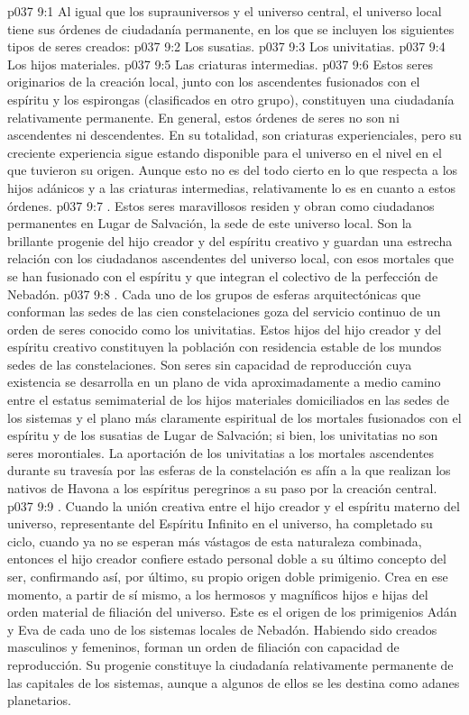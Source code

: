 \vs p037 9:1 Al igual que los suprauniversos y el universo central, el universo local tiene sus órdenes de ciudadanía permanente, en los que se incluyen los siguientes tipos de seres creados:
\vs p037 9:2 Los susatias.
\vs p037 9:3 Los univitatias.
\vs p037 9:4 Los hijos materiales.
\vs p037 9:5 Las criaturas intermedias.
\vs p037 9:6 \pc Estos seres originarios de la creación local, junto con los ascendentes fusionados con el espíritu y los espirongas (clasificados en otro grupo), constituyen una ciudadanía relativamente permanente. En general, estos órdenes de seres no son ni ascendentes ni descendentes. En su totalidad, son criaturas experienciales, pero su creciente experiencia sigue estando disponible para el universo en el nivel en el que tuvieron su origen. Aunque esto no es del todo cierto en lo que respecta a los hijos adánicos y a las criaturas intermedias, relativamente lo es en cuanto a estos órdenes.
\vs p037 9:7 \pc {}. Estos seres maravillosos residen y obran como ciudadanos permanentes en Lugar de Salvación, la sede de este universo local. Son la brillante progenie del hijo creador y del espíritu creativo y guardan una estrecha relación con los ciudadanos ascendentes del universo local, con esos mortales que se han fusionado con el espíritu y que integran el colectivo de la perfección de Nebadón.
\vs p037 9:8 \pc {}. Cada uno de los grupos de esferas arquitectónicas que conforman las sedes de las cien constelaciones goza del servicio continuo de un orden de seres conocido como los univitatias. Estos hijos del hijo creador y del espíritu creativo constituyen la población con residencia estable de los mundos sedes de las constelaciones. Son seres sin capacidad de reproducción cuya existencia se desarrolla en un plano de vida aproximadamente a medio camino entre el estatus semimaterial de los hijos materiales domiciliados en las sedes de los sistemas y el plano más claramente espiritual de los mortales fusionados con el espíritu y de los susatias de Lugar de Salvación; si bien, los univitatias no son seres morontiales. La aportación de los univitatias a los mortales ascendentes durante su travesía por las esferas de la constelación es afín a la que realizan los nativos de Havona a los espíritus peregrinos a su paso por la creación central.
\vs p037 9:9 \pc {}. Cuando la unión creativa entre el hijo creador y el espíritu materno del universo, representante del Espíritu Infinito en el universo, ha completado su ciclo, cuando ya no se esperan más vástagos de esta naturaleza combinada, entonces el hijo creador confiere estado personal doble a su último concepto del ser, confirmando así, por último, su propio origen doble primigenio. Crea en ese momento, a partir de sí mismo, a los hermosos y magníficos hijos e hijas del orden material de filiación del universo. Este es el origen de los primigenios Adán y Eva de cada uno de los sistemas locales de Nebadón. Habiendo sido creados masculinos y femeninos, forman un orden de filiación con capacidad de reproducción. Su progenie constituye la ciudadanía relativamente permanente de las capitales de los sistemas, aunque a algunos de ellos se les destina como adanes planetarios.

